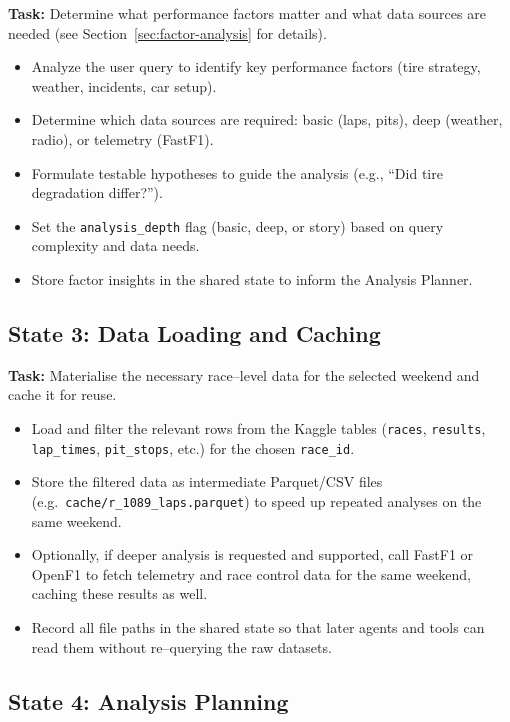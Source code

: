\documentclass[11pt]{article}
\begin{document}
\textbf{Task:} Determine what performance factors matter and what data sources are needed (see Section~\ref{sec:factor-analysis} for details).

\begin{itemize}[leftmargin=1.5em]
    \item Analyze the user query to identify key performance factors (tire strategy, weather, incidents, car setup).
    \item Determine which data sources are required: basic (laps, pits), deep (weather, radio), or telemetry (FastF1).
    \item Formulate testable hypotheses to guide the analysis (e.g., ``Did tire degradation differ?'').
    \item Set the \texttt{analysis\_depth} flag (basic, deep, or story) based on query complexity and data needs.
    \item Store factor insights in the shared state to inform the Analysis Planner.
\end{itemize}

\subsection*{State 3: Data Loading and Caching}

\textbf{Task:} Materialise the necessary race–level data for the selected weekend and cache it for reuse.

\begin{itemize}[leftmargin=1.5em]
    \item Load and filter the relevant rows from the Kaggle tables (\texttt{races}, \texttt{results}, \texttt{lap\_times}, \texttt{pit\_stops}, etc.) for the chosen \texttt{race\_id}.
    \item Store the filtered data as intermediate Parquet/CSV files (e.g.\ \texttt{cache/r\_1089\_laps.parquet}) to speed up repeated analyses on the same weekend.
    \item Optionally, if deeper analysis is requested and supported, call FastF1 or OpenF1 to fetch telemetry and race control data for the same weekend, caching these results as well.
    \item Record all file paths in the shared state so that later agents and tools can read them without re–querying the raw datasets.
\end{itemize}

\subsection*{State 4: Analysis Planning}
\end{document}
